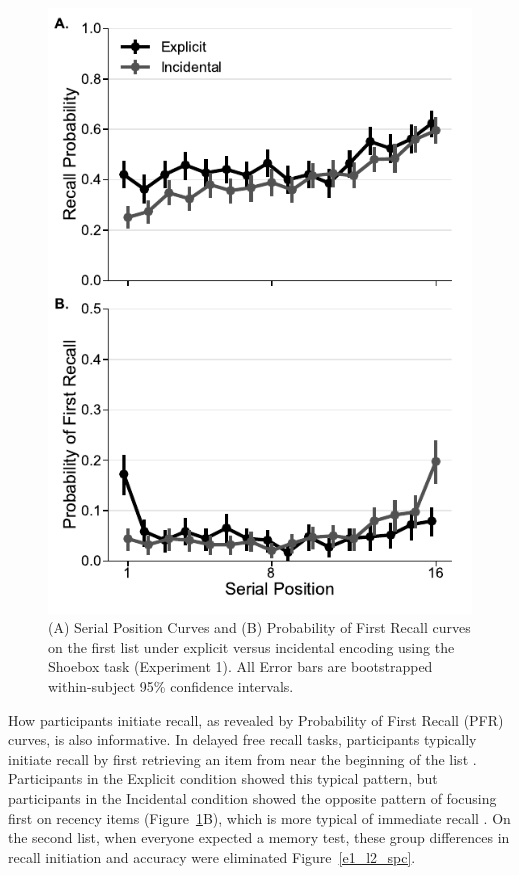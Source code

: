 \documentclass[man,natbib,floatsintext]{apa6} %
\begin{document}
\newcommand\spcpaneltext{All Error bars are bootstrapped within-subject 95\% confidence intervals.}
\begin{figure}
\includegraphics{figures/E1_spc_list1.pdf}
\caption{(A) Serial Position Curves and (B) Probability of First Recall curves on the first list under explicit versus incidental encoding using the Shoebox task (Experiment 1). \spcpaneltext}
\label{e1_l1_spc}
\end{figure}

How participants initiate recall, as revealed by Probability of First Recall (PFR) curves, is also informative. In delayed free recall tasks, participants typically initiate recall by first retrieving an item from near the beginning of the list \citep[i.e., they focus first on primacy items][]{HowaKaha99}. Participants in the Explicit condition showed this typical pattern, but participants in the Incidental condition showed the opposite pattern of focusing first on recency items (Figure~\ref{e1_l1_spc}B), which is more typical of immediate recall \citep{Hoga75}. On the second list, when everyone expected a memory test, these group differences in recall initiation and accuracy were eliminated Figure~\ref{e1_l2_spc}. 
\end{document}
